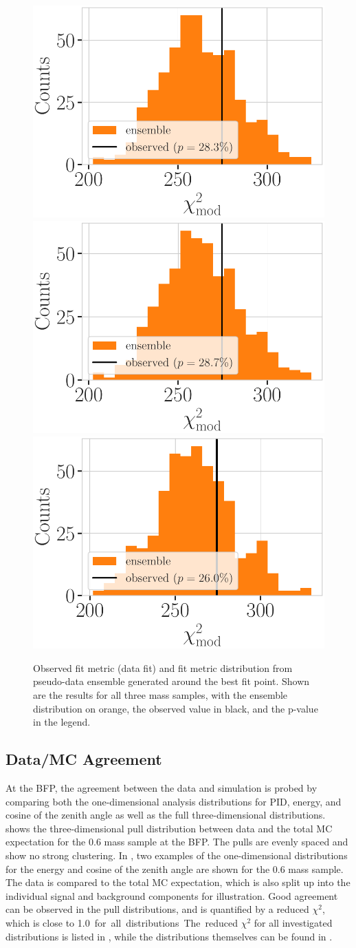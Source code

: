 \begin{figure}[h]
    \includegraphics[width=0.32\linewidth]{figures/results/blind_fits/blind_fit_ensemble_comparison_0.3_GeV.pdf}
    \includegraphics[width=0.32\linewidth]{figures/results/blind_fits/blind_fit_ensemble_comparison_0.6_GeV.pdf}
    \includegraphics[width=0.32\linewidth]{figures/results/blind_fits/blind_fit_ensemble_comparison_1.0_GeV.pdf}
	\caption[Pseudo-data trials fit metric distributions]{Observed fit metric (data fit) and fit metric distribution from pseudo-data ensemble generated around the best fit point. Shown are the results for all three mass samples, with the ensemble distribution on orange, the observed value in black, and the p-value in the legend.}
\end{figure}


\subsection{Data/MC Agreement} 

At the BFP, the agreement between the data and simulation is probed by comparing both the one-dimensional analysis distributions for PID, energy, and cosine of the zenith angle as well as the full three-dimensional distributions.  shows the three-dimensional pull distribution between data and the total MC expectation for the \SI{0.6}{\gev} mass sample at the BFP. The pulls are evenly spaced and show no strong clustering. In , two examples of the one-dimensional distributions for the energy and cosine of the zenith angle are shown for the \SI{0.6}{\gev} mass sample. The data is compared to the total MC expectation, which is also split up into the individual signal and background components for illustration. Good agreement can be observed in the pull distributions, and is quantified by a reduced $\chi^2$, which is close to \SI{1.0} for all distributions. The reduced $\chi^2$ for all investigated distributions is listed in , while the distributions themselves can be found in .


